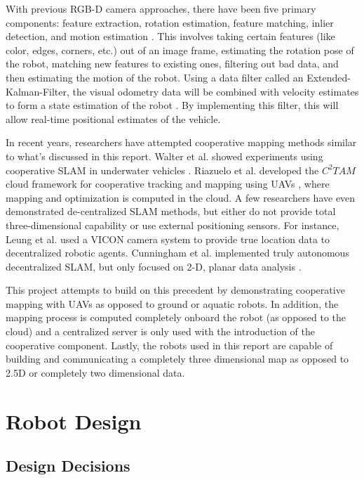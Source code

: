 \documentclass[letterpaper, oneside, 10pt]{report}
\begin{document}
With previous RGB-D camera approaches, there have been five primary components: feature extraction, rotation estimation, feature matching, inlier detection, and motion estimation \cite{huang2011visual}. This involves taking certain features (like color, edges, corners, etc.) out of an image frame, estimating the rotation pose of the robot, matching new features to existing ones, filtering out bad data, and then estimating the motion of the robot. Using a data filter called an Extended-Kalman-Filter, the visual odometry data will be combined with velocity estimates to form a state estimation of the robot \cite{huang2011visual}. By implementing this filter, this will allow real-time positional estimates of the vehicle.


In recent years, researchers have attempted cooperative mapping methods similar to what's discussed in this report. Walter et al. showed experiments using cooperative SLAM in underwater vehicles \cite{walter2004experimental}. Riazuelo et al. developed the $C^{2}TAM$ cloud framework for cooperative tracking and mapping using UAVs \cite{riazuelo2014c}, where mapping and optimization is computed in the cloud. A few researchers have even demonstrated de-centralized SLAM methods, but either do not provide total three-dimensional capability or use external positioning sensors. For instance, Leung et al. used a VICON camera system \cite{leung2012decentralized} to provide true location data to decentralized robotic agents. Cunningham et al. implemented truly autonomous decentralized SLAM, but only focused on 2-D, planar data analysis \cite{cunningham2012large}.

This project attempts to build on this precedent by demonstrating cooperative mapping with UAVs as opposed to ground or aquatic robots. In addition, the mapping process is computed completely onboard the robot (as opposed to the cloud) and a centralized server is only used with the introduction of the cooperative component. Lastly, the robots used in this report are capable of building and communicating a completely three dimensional map as opposed to 2.5D or completely two dimensional data.

\chapter{Robot Design}

\section{Design Decisions}
\end{document}
